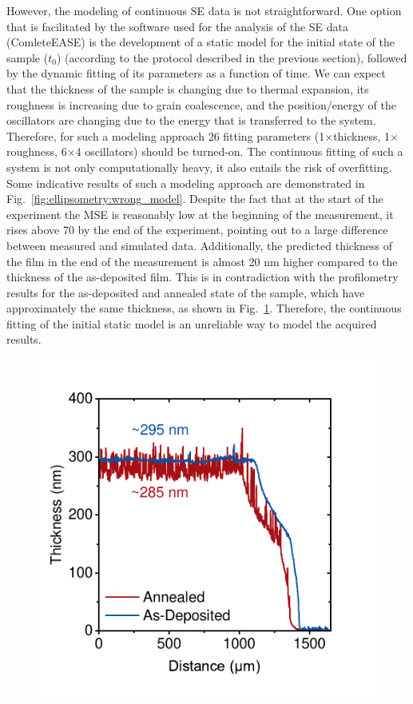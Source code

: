 However, the modeling of continuous SE data is not straightforward. One option that is facilitated by the software used for the analysis of the SE data (ComleteEASE) is the development of a static model for the initial state of the sample ($t_0$) (according to the protocol described in the previous section), followed by the dynamic fitting of its parameters as a function of time. We can expect that the thickness of the sample is changing due to thermal expansion, its roughness is increasing due to grain coalescence, and the position/energy of the oscillators are changing due to the energy that is transferred to the system. Therefore, for such a modeling approach 26 fitting parameters (1$\times$thickness, 1$\times$roughness, 6$\times$4 oscillators) should be turned-on. The continuous fitting of such a system is not only computationally heavy, it also entails the risk of overfitting. Some indicative results of such a modeling approach are demonstrated in Fig.~\ref{fig:ellipsometry:wrong_model}. Despite the fact that at the start of the experiment the MSE is reasonably low at the beginning of the measurement, it rises above 70 by the end of the experiment, pointing out to a large difference between measured and simulated data. Additionally, the predicted thickness of the film in the end of the measurement is almost 20 nm higher compared to the thickness of the as-deposited film. This is in contradiction with the profilometry results for the as-deposited and annealed state of the sample, which have approximately the same thickness, as shown in Fig.~\ref{fig:ellipsometry:profilometry}. Therefore, the continuous fitting of the initial static model is an unreliable way to model the acquired results. 


\begin{figure}
  \centering
  \medskip
  \includegraphics[width=.5\textwidth]{chapters/ellipsometry/image/Dektak.pdf}
  \caption{}
  \label{fig:ellipsometry:profilometry}
\end{figure}

